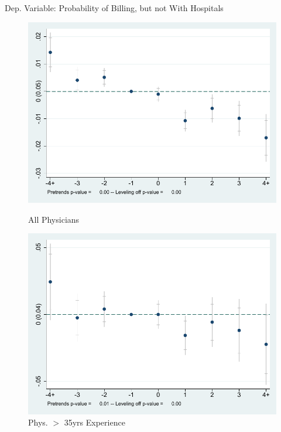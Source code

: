 \documentclass[10pt]{beamer}
\begin{document}
\begin{frame}{Dep. Variable: Probability of Billing, but not With Hospitals}
\begin{figure}[ht]
        \begin{minipage}[b]{0.47\linewidth}
            \centering
            \includegraphics[width=\textwidth]{Objects/xtevent_fullsample_ind.pdf}
            \caption{\small All Physicians}
        \end{minipage}
        \hspace{0.2cm}
        \begin{minipage}[b]{0.47\linewidth}
            \centering
            \includegraphics[width=\textwidth]{Objects/xtevent_oldsample_ind.pdf}
            \caption{\small Phys. $>$ 35yrs Experience}
        \end{minipage}
    \end{figure}
\end{frame}
\end{document}
